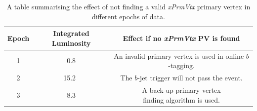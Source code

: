 \begin{table}[!htb]
  \begin{center}
  \begin{tabular}{ | c || c | c |}
    \hline			
    \textbf{Epoch}  & \textbf{Integrated Luminosity}    & \textbf{Effect if no \textit{xPrmVtx} PV is found} \\ \hline
    \parbox[c]{0.2cm}{\vspace{0.5em}1}      &  \parbox[c]{1cm}{\vspace{0.5em}~0.8~\ifb{}}     & \parbox[t]{4.5cm} {An invalid primary vertex \\is used in online $b$-tagging. \vspace{0.2em}} \\
    \hline                                                     
    \parbox[c]{0.2cm}{\vspace{0.5em}2}      &  \parbox[c]{1.2cm}{\vspace{0.5em}15.2~\ifb{}}     & \parbox[t]{4.5cm}{The $b$-jet trigger will not \\pass the event. \vspace{0.2em} }\\
    \hline                                                
    \parbox[c]{0.2cm}{\vspace{0.5em}3}      &  \parbox[c]{1cm}{\vspace{0.5em}~8.3~\ifb{}}     & \parbox[t]{4.5cm} {A back-up primary vertex \\ finding algorithm is used.\vspace{0.2em}} \\
    \hline
  \end{tabular}
  \end{center}
  \caption{A table summarising the effect of not finding a valid \textit{xPrmVtx} primary vertex in different epochs of data.}
  \label{tab:trig-epochs}
\end{table}

